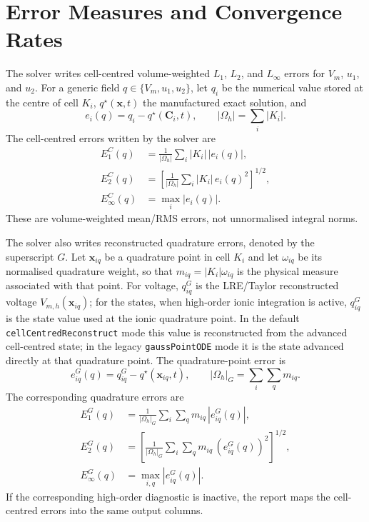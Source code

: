 \documentclass[11pt,a4paper]{article}
\newcommand{\code}[1]{\texttt{\small #1}}
\begin{document}
\section{Error Measures and Convergence Rates}
The solver writes cell-centred volume-weighted $L_1$, $L_2$, and $L_\infty$
errors for $V_m$, $u_1$, and $u_2$. For a generic field $q\in\{V_m,u_1,u_2\}$,
let $q_i$ be the numerical value stored at the centre of cell $K_i$,
$q^\star(\mathbf{x},t)$ the manufactured exact solution, and
\begin{equation}
  e_i(q)=q_i-q^\star(\mathbf{C}_i,t),
  \qquad
  |\Omega_h|=\sum_i |K_i|.
\end{equation}
The cell-centred errors written by the solver are
\begin{align}
  E_{1}^{C}(q)
  &=
  \frac{1}{|\Omega_h|}
  \sum_i |K_i|\,|e_i(q)|,
  \label{eq:cell-l1-error}
  \\
  E_{2}^{C}(q)
  &=
  \left[
  \frac{1}{|\Omega_h|}
  \sum_i |K_i|\,e_i(q)^2
  \right]^{1/2},
  \label{eq:cell-l2-error}
  \\
  E_{\infty}^{C}(q)
  &=
  \max_i |e_i(q)|.
  \label{eq:cell-linf-error}
\end{align}
These are volume-weighted mean/RMS errors, not unnormalised integral norms.

The solver also writes reconstructed quadrature errors, denoted by the
superscript $G$. Let $\mathbf{x}_{iq}$ be a quadrature point in cell $K_i$ and
let $\omega_{iq}$ be its normalised quadrature weight, so that
$m_{iq}=|K_i|\omega_{iq}$ is the physical measure associated with that point.
For voltage, $q^G_{iq}$ is the LRE/Taylor reconstructed voltage
$V_{m,h}(\mathbf{x}_{iq})$; for the states, when high-order ionic integration is
active, $q^G_{iq}$ is the state value used at the ionic quadrature point. In
the default \code{cellCentredReconstruct} mode this value is reconstructed from
the advanced cell-centred state; in the legacy \code{gaussPointODE} mode it is
the state advanced directly at that quadrature point.
The quadrature-point error is
\begin{equation}
  e_{iq}^{G}(q)=q^G_{iq}-q^\star(\mathbf{x}_{iq},t),
  \qquad
  |\Omega_h|_G=\sum_i\sum_q m_{iq}.
\end{equation}
The corresponding quadrature errors are
\begin{align}
  E_{1}^{G}(q)
  &=
  \frac{1}{|\Omega_h|_G}
  \sum_i\sum_q m_{iq}\,|e_{iq}^{G}(q)|,
  \label{eq:gauss-l1-error}
  \\
  E_{2}^{G}(q)
  &=
  \left[
  \frac{1}{|\Omega_h|_G}
  \sum_i\sum_q m_{iq}\,\left(e_{iq}^{G}(q)\right)^2
  \right]^{1/2},
  \label{eq:gauss-l2-error}
  \\
  E_{\infty}^{G}(q)
  &=
  \max_{i,q} |e_{iq}^{G}(q)|.
  \label{eq:gauss-linf-error}
\end{align}
If the corresponding high-order diagnostic is inactive, the report maps the
cell-centred errors into the same output columns.
\end{document}
